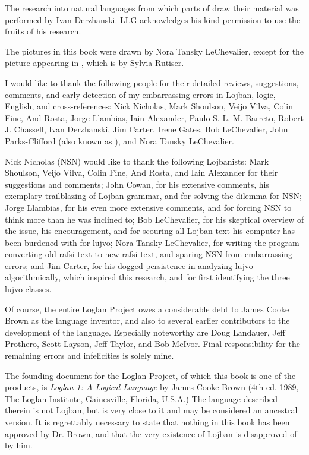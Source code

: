 The research into natural languages from which parts of  draw their material was performed by Ivan Derzhanski. LLG acknowledges his kind permission to use the fruits of his research.

The pictures in this book were drawn by Nora Tansky LeChevalier, except for the picture appearing in , which is by Sylvia Rutiser.

I would like to thank the following people for their detailed reviews, suggestions, comments, and early detection of my embarrassing errors in Lojban, logic, English, and cross-references: Nick Nicholas, Mark Shoulson, Veijo Vilva, Colin Fine, And Rosta, Jorge Llambias, Iain Alexander, Paulo S. L. M. Barreto, Robert J. Chassell, Ivan Derzhanski, Jim Carter, Irene Gates, Bob LeChevalier, John Parks-Clifford (also known as ), and Nora Tansky LeChevalier.

Nick Nicholas (NSN) would like to thank the following Lojbanists: Mark Shoulson, Veijo Vilva, Colin Fine, And Rosta, and Iain Alexander for their suggestions and comments; John Cowan, for his extensive comments, his exemplary trailblazing of Lojban grammar, and for solving the  dilemma for NSN; Jorge Llambias, for his even more extensive comments, and for forcing NSN to think more than he was inclined to; Bob LeChevalier, for his skeptical overview of the issue, his encouragement, and for scouring all Lojban text his computer has been burdened with for lujvo; Nora Tansky LeChevalier, for writing the program converting old rafsi text to new rafsi text, and sparing NSN from embarrassing errors; and Jim Carter, for his dogged persistence in analyzing lujvo algorithmically, which inspired this research, and for first identifying the three lujvo classes.

Of course, the entire Loglan Project owes a considerable debt to James Cooke Brown as the language inventor, and also to several earlier contributors to the development of the language. Especially noteworthy are Doug Landauer, Jeff Prothero, Scott Layson, Jeff Taylor, and Bob McIvor. Final responsibility for the remaining errors and infelicities is solely mine.



The founding document for the Loglan Project, of which this book is one of the products, is \textit{Loglan 1: A Logical Language} by James Cooke Brown (4th ed. 1989, The Loglan Institute, Gainesville, Florida, U.S.A.) The language described therein is not Lojban, but is very close to it and may be considered an ancestral version. It is regrettably necessary to state that nothing in this book has been approved by Dr. Brown, and that the very existence of Lojban is disapproved of by him.

